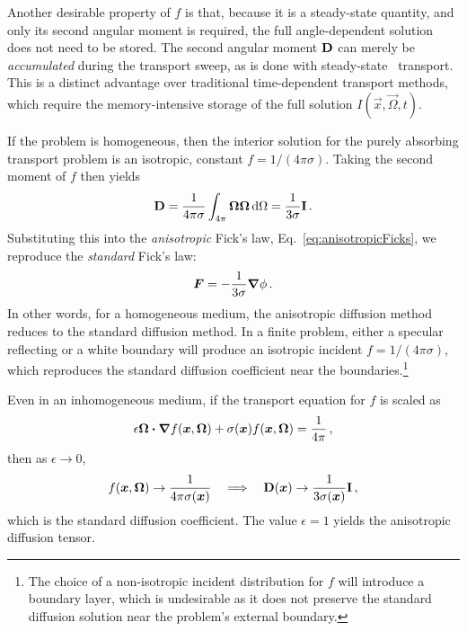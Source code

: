 Another desirable property of $f$ is that, because it is a steady-state
quantity, and only its second angular moment is required, the
full angle-dependent solution does not need to be stored. The second angular
moment $\mathbf{D}$ can merely be \emph{accumulated} during the transport sweep, as
is done with steady-state
\SN\ transport. This is a distinct
advantage over traditional time-dependent transport methods, which require the
memory-intensive storage of the full solution $I(\vec{x},\vec{\Omega},t)$.

If the problem is homogeneous, then the interior solution for the purely
absorbing transport problem is an isotropic, constant $f=1/(4\pi\sigma)$.
Taking the second moment of $f$ then yields
\begin{equation*}
  \mathbf{D} = \frac{1}{4\pi\sigma} \int_{4\pi} \bm{\Omega} \bm{\Omega} \mathop{}\!\mathrm{d} \Omega
  = \frac{1}{3\sigma} \mathbf{I}\,.
\end{equation*}
Substituting this into the \emph{anisotropic} Fick's law,
Eq.~\eqref{eq:anisotropicFicks}, we reproduce the \emph{standard} Fick's law:
\begin{equation*}
  \bm{F} = - \frac{1}{3\sigma} \bm{\nabla} \phi\,.
\end{equation*}
In other words, for a homogeneous medium, the anisotropic diffusion method
reduces to the standard diffusion method. In a finite problem, either a specular
reflecting or a white boundary will produce an isotropic incident
$f=1/(4\pi\sigma)$, which reproduces the standard diffusion coefficient near the
boundaries.\footnote{%
The choice of a non-isotropic incident distribution for $f$ will introduce a
boundary layer, which is undesirable as it does not preserve the
standard diffusion solution near the problem's external boundary.}

Even in an inhomogeneous medium, if the transport equation for $f$ is
scaled as
\begin{equation*}
  \epsilon \bm{\Omega}\bm{\cdot}\bm{\nabla} f(\bm{x},\bm{\Omega})
  + \sigma(\bm{x})  f(\bm{x},\bm{\Omega}) = \frac{1}{4\pi}\,,
\end{equation*}
then as $\epsilon\to 0$,
\begin{equation*}
  f(\bm{x}, \bm{\Omega}) \to \frac{1}{4\pi \sigma(\bm{x})} \quad \Longrightarrow \quad
  \mathbf{D}(\bm{x}) \to \frac{1}{3 \sigma(\bm{x})} \mathbf{I}\,,
\end{equation*}
which is the standard diffusion coefficient. The value $\epsilon=1$ yields the
anisotropic diffusion tensor.

